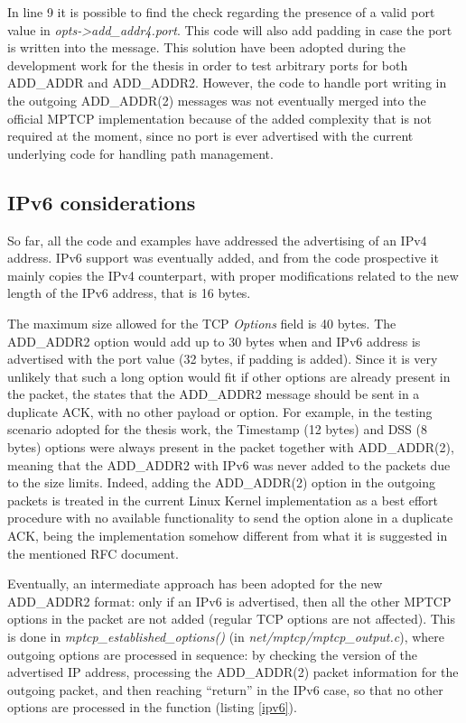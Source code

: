 In line 9 it is possible to find the check regarding the presence of a valid port value in \textit{opts->add\_addr4.port}. This code will also add padding in case the port is written into the message. This solution have been adopted during the development work for the thesis in order to test arbitrary ports for both ADD\_ADDR and ADD\_ADDR2. However, the code to handle port writing in the outgoing ADD\_ADDR(2) messages was not eventually merged into the official MPTCP implementation because of the added complexity that is not required at the moment, since no port is ever advertised with the current underlying code for handling path management.

\subsection{IPv6 considerations}
So far, all the code and examples have addressed the advertising of an IPv4 address. IPv6 support was eventually added, and from the code prospective it mainly copies the IPv4 counterpart, with proper modifications related to the new length of the IPv6 address, that is 16 bytes. 

The maximum size allowed for the TCP \textit{Options} field is 40 bytes. The ADD\_ADDR2 option would add up to 30 bytes when and IPv6 address is advertised with the port value (32 bytes, if padding is added). Since it is very unlikely that such a long option would fit if other options are already present in the packet, the  states that the ADD\_ADDR2 message should be sent in a duplicate ACK, with no other payload or option. 
For example, in the testing scenario adopted for the thesis work, the Timestamp (12 bytes) and DSS (8 bytes) options were always present in the packet together with ADD\_ADDR(2), meaning that the ADD\_ADDR2 with IPv6 was never added to the packets due to the size limits. Indeed, adding the ADD\_ADDR(2) option in the outgoing packets is treated in the current Linux Kernel implementation as a best effort procedure with no available functionality to send the option alone in a duplicate ACK, being the implementation somehow different from what it is suggested in the mentioned RFC document.

Eventually, an intermediate approach has been adopted for the new ADD\_ADDR2 format: only if an IPv6 is advertised, then all the other MPTCP options in the packet are not added (regular TCP options are not affected). This is done in \textit{mptcp\_established\_options()} (in \textit{ net/mptcp/mptcp\_output.c}), where outgoing options are processed in sequence: by checking the version of the advertised IP address, processing the ADD\_ADDR(2) packet information for the outgoing packet, and then reaching ``return'' in the IPv6 case, so that no other options are processed in the function (listing \ref{ipv6}).

